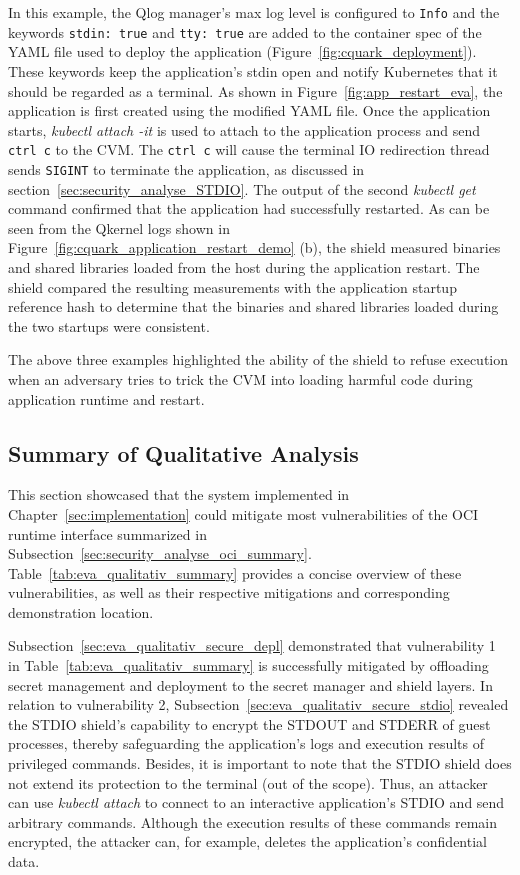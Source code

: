 In this example, the Qlog manager’s max log level is configured to \texttt{Info} and the keywords \texttt{stdin: true} and \texttt{tty: true} are added to the container spec of the YAML file used to deploy the 
application (Figure~\ref{fig:cquark_deployment}). These keywords keep the application’s stdin open and notify Kubernetes\cite*{k8s} that it should be regarded as a terminal. As shown in Figure~\ref{fig:app_restart_eva}, the application is first created using the modified YAML file. Once the application starts, \emph{kubectl attach -it} is used to 
attach to the application process and send \texttt{ctrl c} to the CVM. The \texttt{ctrl c} will cause the terminal IO redirection thread sends \texttt{SIGINT} to terminate the application, as discussed in section~\ref{sec:security_analyse_STDIO}. The output of the second \emph{kubectl get} command confirmed that the application had successfully restarted. 
As can be seen from the Qkernel logs shown in Figure~\ref{fig:cquark_application_restart_demo} (b), the shield measured binaries and shared libraries loaded from the host during the application restart. The shield compared the resulting measurements with the application startup reference hash to determine that the binaries and shared libraries loaded during 
the two startups were consistent.


The above three examples highlighted the ability of the shield to refuse execution when an adversary tries to trick the \acrshort{CVM} into loading harmful code during application runtime and restart. 


\subsection{Summary of Qualitative Analysis}
\label{sec:eva_qualitativ_summary}




This section showcased that the system implemented in Chapter~\ref{sec:implementation} could mitigate most vulnerabilities of the OCI runtime interface summarized in Subsection~\ref{sec:security_analyse_oci_summary}. Table~\ref{tab:eva_qualitativ_summary} provides a concise overview of 
these vulnerabilities, as well as their respective mitigations and corresponding demonstration location.

Subsection~\ref{sec:eva_qualitativ_secure_depl} demonstrated that vulnerability 1 in Table~\ref{tab:eva_qualitativ_summary} is successfully mitigated by offloading secret management and deployment to the secret manager and shield layers. In relation to vulnerability 2, 
Subsection~\ref{sec:eva_qualitativ_secure_stdio} revealed the STDIO shield's capability to encrypt the STDOUT and STDERR of guest processes, thereby safeguarding the application's logs and execution results of privileged commands. Besides, it is important to note that the STDIO 
shield does not extend its protection to the terminal (out of the scope). Thus, an attacker can use \emph{kubectl attach} to connect to an interactive application's STDIO and send arbitrary commands. Although the execution results of these commands remain encrypted, 
the attacker can, for example, deletes the application's confidential data. 


